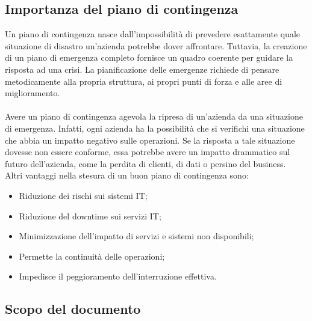 \documentclass[12pt, a4paper, titlepage]{report}
\begin{document}
	\subsection{Importanza del piano di contingenza} \label{importanza}
	
	Un piano di contingenza nasce dall'impossibilità di prevedere esattamente quale situazione di disastro un'azienda
	potrebbe dover affrontare. Tuttavia, la creazione di un piano di emergenza completo fornisce un quadro coerente per
	guidare la risposta ad una crisi. La pianificazione delle emergenze richiede di pensare metodicamente alla propria
	struttura, ai propri punti di forza e alle aree di miglioramento.\\
	\\Avere un piano di contingenza agevola la ripresa di un'azienda da una situazione di emergenza. Infatti, 
	ogni azienda ha la possibilità che si verifichi una situazione che abbia un impatto negativo sulle operazioni. Se la
	risposta a tale situazione dovesse non essere conforme, essa potrebbe avere un impatto drammatico sul futuro dell'azienda, come la perdita di clienti, di dati o persino del business.\\	
	Altri vantaggi nella stesura di un buon piano di contingenza sono:
	\begin{itemize}
		\item Riduzione dei rischi sui sistemi IT;
		\item Riduzione del downtime sui servizi IT;
		\item Minimizzazione dell'impatto di servizi e sistemi non disponibili;
		\item Permette la continuità delle operazioni;
		\item Impedisce il peggioramento dell'interruzione effettiva.
	\end{itemize}
	
		\subsection{Scopo del documento} \label{scopo}
	
\end{document}
